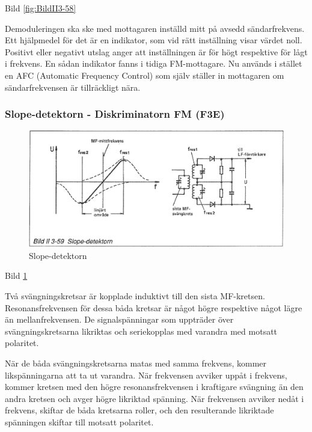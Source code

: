Bild \ref{fig:BildII3-58}

Demoduleringen ska ske med mottagaren inställd mitt på avsedd
sändarfrekvens.  Ett hjälpmedel för det är en indikator, som vid rätt
inställning visar värdet noll. Positivt eller negativt utslag anger
att inställningen är för högt respektive för lågt i frekvens. En sådan
indikator fanns i tidiga FM-mottagare. Nu används i stället en AFC
(Automatic Frequency Control) som själv ställer in mottagaren
om sändarfrekvensen är tillräckligt nära.

\subsubsection{Slope-detektorn - Diskriminatorn FM (F3E)}

\begin{figure}
\includegraphics[width=\textwidth]{images/bild_2_3-59}
\caption{Slope-detektorn}
\label{fig:BildII3-59}
\end{figure}

Bild \ref{fig:BildII3-59}

Två svängningskretsar är kopplade induktivt till den sista
MF-kretsen. Resonansfrekvensen för dessa båda kretsar är något högre
respektive något lägre än mellanfrekvensen. De signalspänningar som
uppträder över svängningskretsarna likriktas och seriekopplas med
varandra med motsatt polaritet.

När de båda svängningskretsarna matas med samma frekvens, kommer
likspänningarna att ta ut varandra. När frekvensen avviker uppåt i
frekvens, kommer kretsen med den högre resonansfrekvensen i kraftigare
svängning än den andra kretsen och avger högre likriktad spänning. När
frekvensen avviker nedåt i frekvens, skiftar de båda kretsarna roller,
och den resulterande likriktade spänningen skiftar till motsatt
polaritet.

